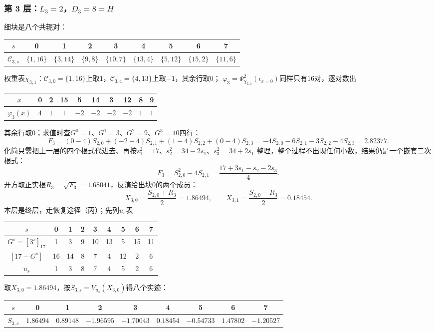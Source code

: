 \documentclass[UTF8,a4paper,11pt]{ctexart}
\begin{document}
\subsubsection{第 3 层：$L_3=2$，$D_3=8=H$}
细块是八个共轭对：
\begin{center}
\begin{tabular}{c|cccccccc}
\toprule
$s$ & 0&1&2&3&4&5&6&7\\
\midrule
$\mathscr{C}_{3,s}$ & $\{1,16\}$&$\{3,14\}$&$\{9,8\}$&$\{10,7\}$&$\{13,4\}$&$\{5,12\}$&$\{15,2\}$&$\{11,6\}$\\
\bottomrule
\end{tabular}
\end{center}
权重表$\chi_{3,1}$：$\mathscr{C}_{3,0}=\{1,16\}$上取$1$，$\mathscr{C}_{3,4}=\{4,13\}$上取$-1$，其余行取$0$；
$\varphi_3=\Psi_{\chi_{3,1}}^{2}(\iota_{x=0})$同样只有$16$对，逐对数出
\begin{center}
\begin{tabular}{c|ccccccccc}
\toprule
$x$ & 0&2&15&5&14&3&12&8&9\\
\midrule
$\varphi_3(x)$ & $4$&$1$&$1$&$-2$&$-2$&$-2$&$-2$&$1$&$1$\\
\bottomrule
\end{tabular}
\end{center}
其余行取$0$；求值时查$G^0=1$、$G^1=3$、$G^2=9$、$G^3=10$四行：
\[
 F_3=(0-4)S_{2,0}+(-2-4)S_{2,1}+(1-4)S_{2,2}+(0-4)S_{2,3}
 =-4S_{2,0}-6S_{2,1}-3S_{2,2}-4S_{2,3}=2.82377.
\]
化简只需把上一层的四个根式代进去、再按$s_1^2=17$、$s_2^2=34-2s_1$、$s_3^2=34+2s_1$
整理，整个过程不出现任何小数，结果仍是一个嵌套二次根式：
\[
 F_3=S_{2,0}^2-4S_{2,1}=\frac{17+3s_1-s_2-2s_3}{4}.
\]
开方取正实根$R_3=\sqrt{F_3}=1.68041$，反演给出块$0$的两个成员：
\[
 X_{3,0}=\frac{S_{2,0}+R_3}{2}=1.86494,\qquad
 X_{3,1}=\frac{S_{2,0}-R_3}{2}=0.18454.
\]
本层是终层，走恢复途径（丙）；先列$u_s$表
\begin{center}
\begin{tabular}{c|cccccccc}
\toprule
$s$ & 0&1&2&3&4&5&6&7\\
\midrule
$G^s=[3^s]_{17}$ & 1&3&9&10&13&5&15&11\\
$[17-G^s]$ & 16&14&8&7&4&12&2&6\\
$u_s$ & 1&3&8&7&4&5&2&6\\
\bottomrule
\end{tabular}
\end{center}
取$X_{3,0}=1.86494$，按$S_{3,s}=V_{u_s}(X_{3,0})$得八个实迹：
\begin{center}
\begin{tabular}{c|cccccccc}
\toprule
$s$ & 0&1&2&3&4&5&6&7\\
\midrule
$S_{3,s}$ & $1.86494$&$0.89148$&$-1.96595$&$-1.70043$&$0.18454$&$-0.54733$&$1.47802$&$-1.20527$\\
\bottomrule
\end{tabular}
\end{center}
\end{document}
